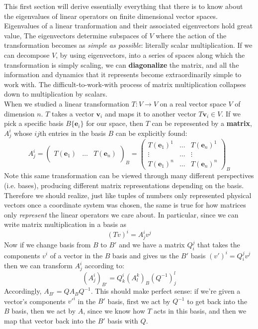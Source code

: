 This first section will derive essentially everything that there is to know about the eigenvalues of linear operators on finite dimensional vector spaces. \\

Eigenvalues of a linear tranformation and their associated eigenvectors hold great value, The eigenvectors determine subspaces of $V$ where the action of the transformation becomes as \emph{simple as possible}: literally scalar multiplication. If we can decompose $V$, by using eigenvectors, into a series of spaces along which the transformation is simply scaling, we can \textbf{diagonalize} the matrix, and all the information and dynamics that it represents become extraordinarily simple to work with. The difficult-to-work-with process of matrix multiplication collapses down to multiplication by scalars. \\

When we studied a linear transformation $T: V \rightarrow V$ on a real vector space $V$ of dimension $n$. $T$ takes a vector $\mathbf v_i$ and maps it to another vector $T\mathbf v_i \in V$. If we pick a specific basis $B \{ \mathbf e_i \}$ for our space, then $T$ can be represented by a \textbf{matrix}, $A^i_j$ whose $ij$th entries in the basis $B$ can be explicitly found: 
	\begin{equation}
		A^i_j = \begin{pmatrix}
			& & \\
			T(\mathbf e_1) & \dots & T(\mathbf e_n)\\
			& &
		\end{pmatrix}_B
		=\begin{pmatrix}
			T(\mathbf e_1)^1 & \dots & T(\mathbf e_n)^1 \\
			\vdots & \dots & \vdots\\
			T(\mathbf e_1)^n & \dots & T(\mathbf e_n)^n
		\end{pmatrix}_B
	\end{equation}
	Note this same transformation can be viewed through many different perspectives (i.e. bases), producing different matrix representations depending on the basis. Therefore we should realize, just like tuples of numbers only represented physical vectors once a coordinate system was chosen, the same is true for how matrices only \emph{represent} the linear operators we care about. In particular, since we can write matrix multiplication in a basis as
	\begin{equation}
		(Tv)^i = A^i_j v^j
	\end{equation}
	Now if we change basis from $B$ to $B'$ and we have a matrix $Q_i^j$ that takes the components $v^i$ of a vector in the $B$ basis and gives us the $B'$ basis $(v')^i = Q_i^j v^j$ then we can transform $A^i_j$ according to:
	\begin{equation}
		(A^i_j)_{B'} = Q^i_k (A^k_l)_B (Q^{-1})^l_j 
	\end{equation}
	Accordingly, $A_{B'} = Q A_B Q^{-1}$. This should make perfect sense: if we're given a vector's components ${v'}^i$ in the $B'$ basis, first we act by $Q^{-1}$ to get back into the $B$ basis, then we act by $A$, since we know how $T$ acts in this basis, and then we map that vector back into the $B'$ basis with $Q$.
	
